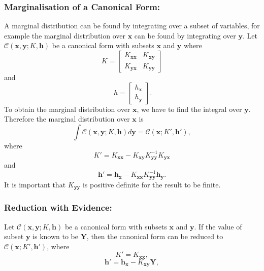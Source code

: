 \documentclass[12pt,oneside,openany,a4paper, %
afrikaans,english,
]{memoir}
\numberwithin{equation}{chapter}
\begin{document}
\subsubsection{Marginalisation of a Canonical Form:}
A marginal distribution can be found by integrating over a subset of variables, for example the marginal distribution over $\bm{x}$ can be found by integrating over $\bm{y}$. Let $\mathcal{C}(\bm{x},\bm{y};K,\bm{h})$ be a canonical form with subsets $\bm{x}$ and $\bm{y}$ where
\begin{equation}
K = 
\begin{bmatrix}
K_{\bm{xx}} & K_{\bm{xy}}\\
K_{\bm{yx}} & K_{\bm{yy}}
\end{bmatrix}
\end{equation}
and
\begin{equation}
\ h = 
\begin{bmatrix}
h_{\bm{x}} \\
h_{\bm{y}}
\end{bmatrix}.
\end{equation}
To obtain the marginal distribution over $\bm{x}$, we have to find the integral over $\bm{y}$. Therefore the marginal distribution over $\bm{x}$ is
\begin{equation}
\int\mathcal{C}(\bm{x},\bm{y};K,\bm{h})d\bm{y} = \mathcal{C}(\bm{x};K',\bm{h}'),
\end{equation}
 where
\begin{equation}
K' = K_{\bm{xx}} - K_{\bm{xy}}K_{\bm{yy}}^{-1}K_{\bm{yx}}
\end{equation}
and
\begin{equation}
\bm{h'} = \bm{h}_{\bm{x}} - K_{\bm{xx}}K_{\bm{yy}}^{-1}\bm{h}_{\bm{y}}.
\end{equation}
It is important that $K_{\bm{yy}}$ is positive definite for the result to be finite.
\subsubsection{Reduction with Evidence:}
Let $\mathcal{C}(\bm{x},\bm{y};K,\bm{h})$ be a canonical form with subsets $\bm{x}$ and $\bm{y}$. If the value of subset $\bm{y}$ is known to be $\bm{Y}$, then the canonical form can be reduced to $\mathcal{C}(\bm{x}; K',\bm{h}')$, where
\begin{equation}
K' = K_{\bm{xx}},
\end{equation}
\begin{equation}
\bm{h'} = \bm{h}_{\bm{x}} - K_{\bm{xy}}\bm{Y},
\end{equation}
\end{document}
